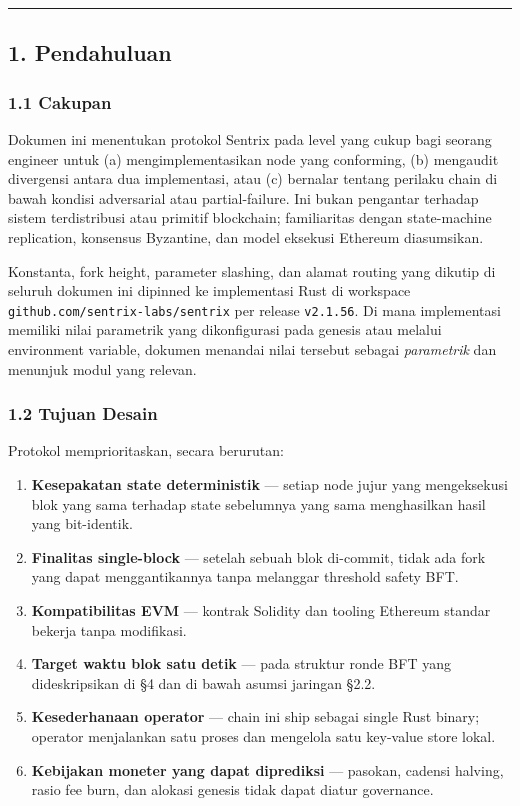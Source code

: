 \documentclass[11pt,a4paper]{article}
\providecommand{\tightlist}{\setlength{\itemsep}{0pt}\setlength{\parskip}{0pt}}
\begin{document}
\begin{center}\rule{0.5\linewidth}{0.5pt}\end{center}

\hypertarget{pendahuluan}{%
\subsection{1. Pendahuluan}\label{pendahuluan}}

\hypertarget{cakupan}{%
\subsubsection{1.1 Cakupan}\label{cakupan}}

Dokumen ini menentukan protokol Sentrix pada level yang cukup bagi seorang engineer untuk (a) mengimplementasikan node yang conforming, (b) mengaudit divergensi antara dua implementasi, atau (c) bernalar tentang perilaku chain di bawah kondisi adversarial atau partial-failure. Ini bukan pengantar terhadap sistem terdistribusi atau primitif blockchain; familiaritas dengan state-machine replication, konsensus Byzantine, dan model eksekusi Ethereum diasumsikan.

Konstanta, fork height, parameter slashing, dan alamat routing yang dikutip di seluruh dokumen ini dipinned ke implementasi Rust di workspace \texttt{github.com/sentrix-labs/sentrix} per release \texttt{v2.1.56}. Di mana implementasi memiliki nilai parametrik yang dikonfigurasi pada genesis atau melalui environment variable, dokumen menandai nilai tersebut sebagai \emph{parametrik} dan menunjuk modul yang relevan.

\hypertarget{tujuan-desain}{%
\subsubsection{1.2 Tujuan Desain}\label{tujuan-desain}}

Protokol memprioritaskan, secara berurutan:

\begin{enumerate}
\def\labelenumi{\arabic{enumi}.}
\tightlist
\item
  \textbf{Kesepakatan state deterministik} --- setiap node jujur yang mengeksekusi blok yang sama terhadap state sebelumnya yang sama menghasilkan hasil yang bit-identik.
\item
  \textbf{Finalitas single-block} --- setelah sebuah blok di-commit, tidak ada fork yang dapat menggantikannya tanpa melanggar threshold safety BFT.
\item
  \textbf{Kompatibilitas EVM} --- kontrak Solidity dan tooling Ethereum standar bekerja tanpa modifikasi.
\item
  \textbf{Target waktu blok satu detik} --- pada struktur ronde BFT yang dideskripsikan di §4 dan di bawah asumsi jaringan §2.2.
\item
  \textbf{Kesederhanaan operator} --- chain ini ship sebagai single Rust binary; operator menjalankan satu proses dan mengelola satu key-value store lokal.
\item
  \textbf{Kebijakan moneter yang dapat diprediksi} --- pasokan, cadensi halving, rasio fee burn, dan alokasi genesis tidak dapat diatur governance.
\end{enumerate}
\end{document}
